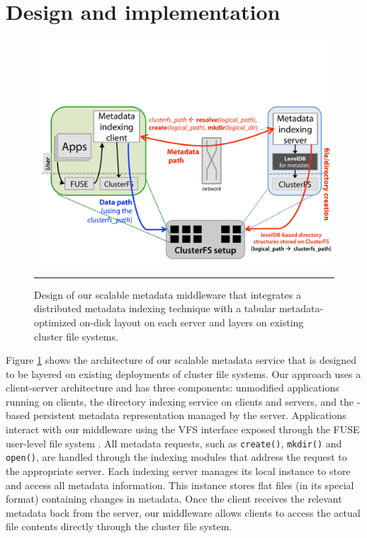 \section{Design and implementation}

\begin{figure}[t]   %
\centerline{\includegraphics[scale=0.3]{./figs/giga-impl-leveldb-clusterfs}}
\caption{\normalsize
Design of our scalable metadata middleware that integrates a distributed metadata indexing
technique with a tabular metadata-optimized on-disk layout on each server and
layers on existing cluster file systems. 
}
\vspace{10pt}
\hrule 
\label{fig:design}
\end{figure}       %

Figure \ref{fig:design} shows the architecture of our scalable metadata
service that is designed to be layered on existing deployments of cluster file
systems. Our approach uses a client-server architecture and has three components: 
unmodified applications running on clients, the \giga{} directory indexing service 
on clients and servers, and the \ldb{}-based persistent metadata representation 
managed by the server.
Applications interact with our middleware using the VFS interface exposed
through the FUSE user-level file system \cite{fuse}.
All metadata requests, such as \texttt{create()}, \texttt{mkdir()} and
\texttt{open()}, are handled through the \giga indexing modules that address
the request to the appropriate server.
Each indexing server manages its local \ldb instance to store and access all
metadata information. This \ldb instance stores flat files (in its special
format) containing changes in metadata. 
Once the client receives the relevant metadata back from the server, our
middleware allows clients to access the actual file contents directly through
the cluster file system.

